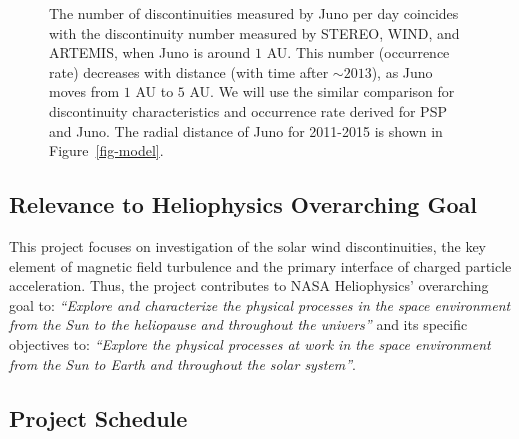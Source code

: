 \documentclass[
  letterpaper,
  DIV=11,
  numbers=noendperiod]{scrartcl}
\begin{document}
\begin{figure}


\caption{\label{fig-rate}The number of discontinuities measured by Juno
per day coincides with the discontinuity number measured by STEREO,
WIND, and ARTEMIS, when Juno is around \(1\) AU. This number (occurrence
rate) decreases with distance (with time after \(\sim 2013\)), as Juno
moves from \(1\) AU to \(5\) AU. We will use the similar comparison for
discontinuity characteristics and occurrence rate derived for PSP and
Juno. The radial distance of Juno for 2011-2015 is shown in
Figure~\ref{fig-model}.}

\end{figure}%

\subsection{Relevance to Heliophysics Overarching
Goal}\label{relevance-to-heliophysics-overarching-goal}

This project focuses on investigation of the solar wind discontinuities,
the key element of magnetic field turbulence and the primary interface
of charged particle acceleration. Thus, the project contributes to NASA
Heliophysics' overarching goal to: \emph{``Explore and characterize the
physical processes in the space environment from the Sun to the
heliopause and throughout the univers''} and its specific objectives to:
\emph{``Explore the physical processes at work in the space environment
from the Sun to Earth and throughout the solar system''}.

\subsection{Project Schedule}\label{project-schedule}
\end{document}
